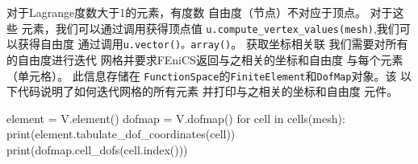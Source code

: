 对于Lagrange度数大于1的元素，有度数
自由度（节点）不对应于顶点。 对于这些
元素，我们可以通过调用获得顶点值
\verb!u.compute_vertex_values(mesh)!,我们可以获得自由度
通过调用\texttt{u.vector()。array()}。 获取坐标相关联
我们需要对所有的自由度进行迭代
网格并要求FEniCS返回与之相关的坐标和自由度
与每个元素（单元格）。 此信息存储在
\texttt{FunctionSpace}的\texttt{FiniteElement}和\texttt{DofMap}对象。该
以下代码说明了如何迭代网格的所有元素
并打印与之相关的坐标和自由度
元件。

\begin{python}
element = V.element()
dofmap = V.dofmap()
for cell in cells(mesh):
    print(element.tabulate_dof_coordinates(cell))
    print(dofmap.cell_dofs(cell.index()))
\end{python}